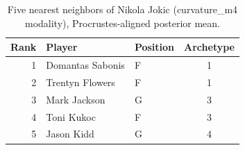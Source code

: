 \begin{table}[htbp]
  \centering\small
  \begin{tabular}{rllc}
    \toprule
    Rank & Player & Position & Archetype \\
    \midrule
    1 & Domantas Sabonis & F & 1 \\
    2 & Trentyn Flowers & F & 1 \\
    3 & Mark Jackson & G & 3 \\
    4 & Toni Kukoc & F & 3 \\
    5 & Jason Kidd & G & 4 \\
    \bottomrule
  \end{tabular}
  \caption{Five nearest neighbors of Nikola Jokic (curvature_m4 modality), Procrustes-aligned posterior mean.}
  \label{tab:Nikola_Jokic_neighbors_curvature_m4}
\end{table}

